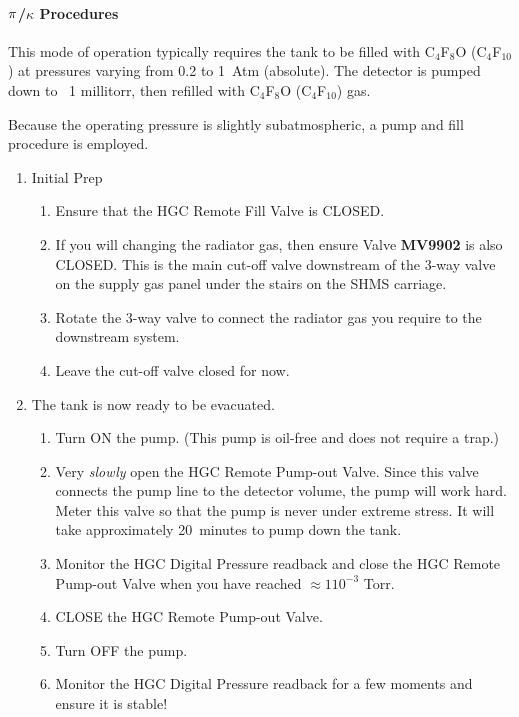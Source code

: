 {\paragraph{$\bf{\pi}$/$\kappa$ Procedures}
This mode of operation typically requires the tank to be filled with C$_4$F$_8$O
(C$_4$F$_{10}$) at pressures varying from 0.2 to 1~Atm (absolute). The detector
is pumped down to ~1 millitorr, then refilled with C$_4$F$_8$O (C$_4$F$_{10}$)
gas.

Because the operating pressure is slightly subatmospheric, a pump and fill
procedure is employed.

\begin{enumerate}
  \item Initial Prep
  \begin{enumerate}
    \item Ensure that the HGC Remote Fill Valve is CLOSED.
    \item If you will changing the radiator gas, then ensure Valve
      \textbf{MV9902} is also CLOSED.  This is the main cut-off valve
      downstream of the 3-way valve on the supply gas panel under the stairs on
      the SHMS carriage.\label{hgc:step:changegas}
    \item Rotate the 3-way valve to connect the radiator gas you require to the
      downstream system.
    \item Leave the cut-off valve closed for now.
  \end{enumerate}

  \item The tank is now ready to be evacuated.
  \begin{enumerate}
    \item Turn ON the pump.  (This pump is oil-free and does not require a trap.)
    \item Very \emph{slowly} open the HGC Remote Pump-out Valve.  Since this
      valve connects the pump line to the detector volume, the pump will work
      hard.  Meter this valve so that the pump is never under extreme stress.  It
      will take approximately 20~minutes to pump down the tank.
    \item Monitor the HGC Digital Pressure readback and close the HGC Remote
      Pump-out Valve when you have reached $\approx 1 10^{-3}$ Torr.
    \item CLOSE the HGC Remote Pump-out Valve.
    \item Turn OFF the pump.
    \item Monitor the HGC Digital Pressure readback for a few moments and ensure
      it is stable!
  \end{enumerate}


\end{enumerate}}
